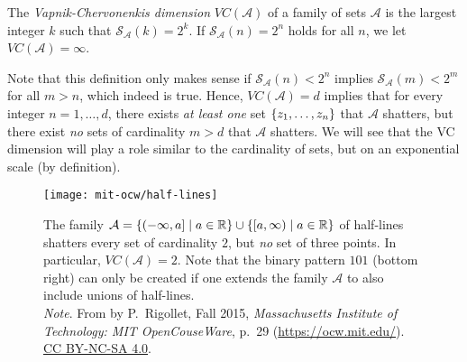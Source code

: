 \begin{definition}
The \emph{Vapnik-Chervonenkis dimension} $VC(\mathcal{A})$ of a family of sets $\mathcal{A}$ is the largest integer $k$ such that $\mathcal{S}_{\mathcal{A}}(k) = 2^k$. If $\mathcal{S}_{\mathcal{A}}(n) = 2^n$ holds for all $n$, we let $VC(\mathcal{A}) = \infty$.
\end{definition}

Note that this definition only makes sense if $\mathcal{S}_{\mathcal{A}}(n) < 2^n$ implies $\mathcal{S}_{\mathcal{A}}(m) < 2^m$ for all $m > n$, which indeed is true. Hence, $VC(\mathcal{A}) = d$ implies that for every integer $n = 1, \dots, d$, there exists \emph{at least one} set $\left\{z_1, \dots, z_n\right\}$ that $\mathcal{A}$ shatters, but there exist \emph{no} sets of cardinality $m > d$ that $\mathcal{A}$ shatters. We will see that the VC dimension will play a role similar to the cardinality of sets, but on an exponential scale (by definition).

\begin{figure}
    \centering
    \texttt{[image: mit-ocw/half-lines]}
    \caption{%
        The family $\mathcal{A} = \left\{(-\infty, a] \mathrel{|} a \in \mathbb{R}\right\} \cup \left\{[a, \infty) \mathrel{|} a \in \mathbb{R}\right\}$ of half-lines shatters every set of cardinality $2$, but \emph{no} set of three points. In particular, $VC(\mathcal{A}) = 2$. Note that the binary pattern $101$ (bottom right) can only be created if one extends the family $\mathcal{A}$ to also include unions of half-lines. \\
        \indent\emph{Note}. From  by P.~Rigollet, Fall 2015, \emph{Massachusetts Institute of Technology: MIT OpenCouseWare}, p.~29 (\url{https://ocw.mit.edu/}). \href{https://creativecommons.org/licenses/by-nc-sa/4.0/}{CC BY-NC-SA 4.0}.
    }
    \label{fig: VC dimension of half-lines}
\end{figure}

